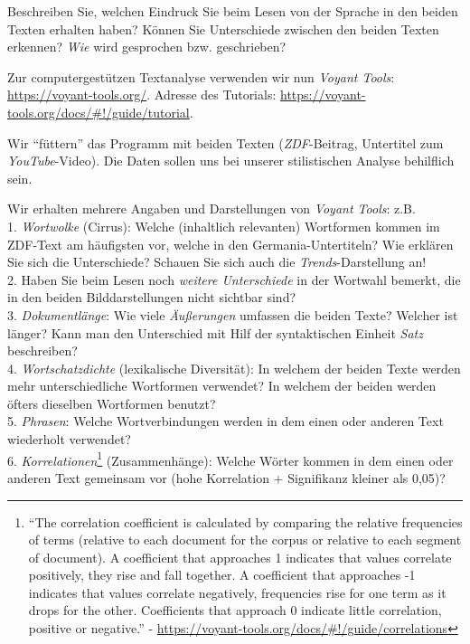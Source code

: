 \documentclass[
  letterpaper,
  DIV=11,
  numbers=noendperiod]{scrreprt}
\begin{document}
Beschreiben Sie, welchen Eindruck Sie beim Lesen von der Sprache in den
beiden Texten erhalten haben? Können Sie Unterschiede zwischen den
beiden Texten erkennen? \emph{Wie} wird gesprochen bzw. geschrieben?

Zur computergestützen Textanalyse verwenden wir nun \emph{Voyant Tools}:
\url{https://voyant-tools.org/}. Adresse des Tutorials:
\url{https://voyant-tools.org/docs/\#!/guide/tutorial}.

Wir ``füttern'' das Programm mit beiden Texten (\emph{ZDF}-Beitrag,
Untertitel zum \emph{YouTube}-Video). Die Daten sollen uns bei unserer
stilistischen Analyse behilflich sein.

Wir erhalten mehrere Angaben und Darstellungen von \emph{Voyant Tools}:
z.B.\\
1. \emph{Wortwolke} (Cirrus): Welche (inhaltlich relevanten) Wortformen
kommen im ZDF-Text am häufigsten vor, welche in den
Germania-Untertiteln? Wie erklären Sie sich die Unterschiede? Schauen
Sie sich auch die \emph{Trends}-Darstellung an!\\
2. Haben Sie beim Lesen noch \emph{weitere Unterschiede} in der Wortwahl
bemerkt, die in den beiden Bilddarstellungen nicht sichtbar sind?\\
3. \emph{Dokumentlänge}: Wie viele \emph{Äußerungen} umfassen die beiden
Texte? Welcher ist länger? Kann man den Unterschied mit Hilf der
syntaktischen Einheit \emph{Satz} beschreiben?\\
4. \emph{Wortschatzdichte} (lexikalische Diversität): In welchem der
beiden Texte werden mehr unterschiedliche Wortformen verwendet? In
welchem der beiden werden öfters dieselben Wortformen benutzt?\\
5. \emph{Phrasen}: Welche Wortverbindungen werden in dem einen oder
anderen Text wiederholt verwendet?\\
6. \emph{Korrelationen}\footnote{``The correlation coefficient is
  calculated by comparing the relative frequencies of terms (relative to
  each document for the corpus or relative to each segment of document).
  A coefficient that approaches 1 indicates that values correlate
  positively, they rise and fall together. A coefficient that approaches
  -1 indicates that values correlate negatively, frequencies rise for
  one term as it drops for the other. Coefficients that approach 0
  indicate little correlation, positive or negative.'' -
  \url{https://voyant-tools.org/docs/\#!/guide/correlations}}
(Zusammenhänge): Welche Wörter kommen in dem einen oder anderen Text
gemeinsam vor (hohe Korrelation + Signifikanz kleiner als 0,05)?
\end{document}
